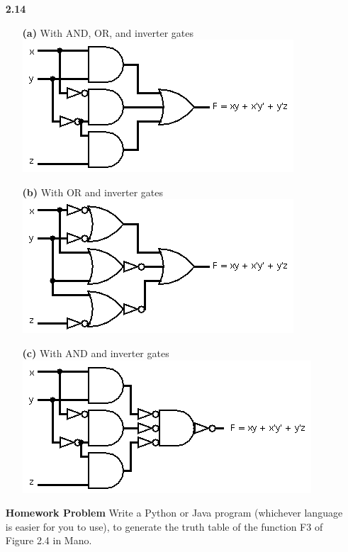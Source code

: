 \documentclass{article}
\begin{document}
\begin{itemize}
	\item [\textbf{2.14}]
	\begin{itemize}
		\item [\textbf{(a)}] With AND, OR, and inverter gates\\
		\includegraphics{214a}
		\item [\textbf{(b)}] With OR and inverter gates\\
		\includegraphics{214b}
		\item [\textbf{(c)}] With AND and inverter gates\\
		\includegraphics{214c}
	\end{itemize}

	\item [\textbf{Homework Problem}] Write a Python or Java program (whichever language is easier for you to use), to generate the truth table of the function F3 of Figure 2.4 in Mano.

\end{itemize}

	
\end{document}
